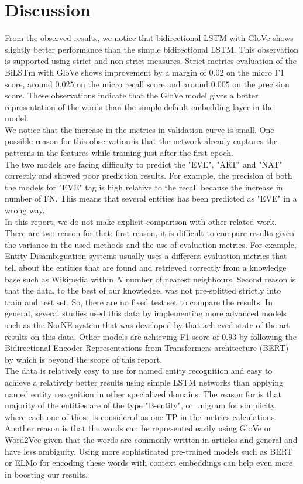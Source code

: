 \documentclass[sigconf, nonacm, natbib, screen, balance=False]{acmart}
\begin{document}
\section{Discussion}\label{sec:discu}
From the observed results, we notice that bidirectional LSTM with GloVe shows slightly better performance than the simple bidirectional LSTM. This observation is supported using strict and non-strict measures. Strict metrics evaluation of the BiLSTm with GloVe shows improvement by a margin of $0.02$ on the micro F1 score, around $0.025$ on the micro recall score and around $0.005$ on the precision score. These observations indicate that the GloVe model gives a better representation of the words than the simple default embedding layer in the model. 
\hfill\\
We notice that the increase in the metrics in validation curve is small. One possible reason for this observation is that the network already captures the patterns in the features while training just after the first epoch.  
\hfill\\
The two models are facing difficulty to predict the "EVE", "ART" and "NAT" correctly and showed poor prediction results. For example, the precision of both the models for "EVE" tag is high relative to the recall because the increase in number of FN. This means that several entities has been predicted as "EVE" in a wrong way.    
\hfill\\
In this report, we do not make explicit comparison with other related work. There are two reason for that: first reason, it is difficult to compare results given the variance in the used methods and the use of evaluation metrics. For example, Entity Disambiguation systems usually uses a different evaluation metrics that tell about the entities that are found and retrieved correctly from a knowledge base such as Wikipedia within $N$ number of nearest neighbours. Second reason is that the data, to the best of our knowledge, was not pre-splitted strictly into train and test set. So, there are no fixed test set to compare the results. In general, several studies used this data by implementing more advanced models such as the NorNE system that was developed by \citet{Jrgensen2020NorNEAN} that achieved state of the art results on this data. Other models are achieving F1 score of $0.93$ by following the Bidirectional Encoder Representations from Transformers architecture (BERT) by \citet{ DBLP:journals/corr/abs-1810-04805} which is beyond the scope of this report. 
\hfill\\
The data is relatively easy to use for named entity recognition and easy to achieve a relatively better results using simple LSTM networks than applying named entity recognition in other specialized domains. The reason for is that majority of the entities are of the type "B-entity", or unigram for simplicity, where each one of those is considered as one TP in the metrics calculations. Another reason is that the words can be represented easily using GloVe or Word2Vec given that the words are commonly written in articles and general and have less ambiguity. Using more sophisticated pre-trained models such as BERT or ELMo \citep{DBLP:journals/corr/abs-1802-05365} for encoding these words with context embeddings can help even more in boosting our results.
\end{document}

